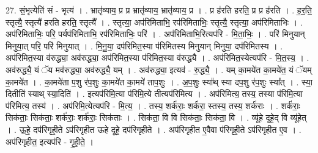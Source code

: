 \documentclass[17pt]{extarticle}
\begin{document}
27. सं॒भृत्येति॑ सं - भृत्य॑ । . भ्रातृ॑व्याय॒ प्र प्र भ्रातृ॑व्याय॒ भ्रातृ॑व्याय॒ प्र । . प्र ह॑रति हरति॒ प्र प्र ह॑रति । . ह॒र॒ति॒ स्तृत्यै॒ स्तृत्यै॑ हरति हरति॒ स्तृत्यै᳚ । . स्तृत्या॒ अप॑रिमिताभि॒ रप॑रिमिताभिः॒ स्तृत्यै॒ स्तृत्या॒ अप॑रिमिताभिः । . अप॑रिमिताभिः॒ परि॒ पर्यप॑रिमिताभि॒ रप॑रिमिताभिः॒ परि॑ । . अप॑रिमिताभि॒रित्यप॑रि - मि॒ता॒भिः॒ । . परि॑ मिनुयान् मिनुया॒त् परि॒ परि॑ मिनुयात् । . मि॒नु॒या॒ दप॑रिमित॒स्या प॑रिमितस्य मिनुयान् मिनुया॒ दप॑रिमितस्य । . अप॑रिमित॒स्या व॑रुद्ध्या॒ अव॑रुद्ध्या॒ अप॑रिमित॒स्या प॑रिमित॒स्या व॑रुद्ध्यै । . अप॑रिमित॒स्येत्यप॑रि - मि॒त॒स्य॒ । . अव॑रुद्ध्यै॒ यं ॅय मव॑रुद्ध्या॒ अव॑रुद्ध्यै॒ यम् । . अव॑रुद्ध्या॒ इत्यव॑ - रु॒द्ध्यै॒ । . यम् का॒मये॑त का॒मये॑त॒ यं ॅयम् का॒मये॑त । . का॒मये॑ता प॒शु र॑प॒शुः का॒मये॑त का॒मये॑ ताप॒शुः । . अ॒प॒शुः स्या᳚थ् स्या दप॒शु र॑प॒शुः स्या᳚त् । . स्या॒ दितीति॑ स्याथ् स्या॒दिति॑ । . इत्यप॑रिमि॒त्या प॑रिमि॒त्ये तीत्यप॑रिमित्य । . अप॑रिमित्य॒ तस्य॒ तस्या प॑रिमि॒त्या प॑रिमित्य॒ तस्य॑ । . अप॑रिमि॒त्येत्यप॑रि - मि॒त्य॒ । . तस्य॒ शर्क॑राः॒ शर्क॑रा॒ स्तस्य॒ तस्य॒ शर्क॑राः । . शर्क॑राः॒ सिक॑ताः॒ सिक॑ताः॒ शर्क॑राः॒ शर्क॑राः॒ सिक॑ताः । . सिक॑ता॒ वि वि सिक॑ताः॒ सिक॑ता॒ वि । . व्यू॑हे दूहे॒द् वि व्यू॑हेत् । . ऊ॒हे॒ दप॑रिगृही॒ते ऽप॑रिगृहीत ऊहे दूहे॒ दप॑रिगृहीते । . अप॑रिगृहीत ए॒वैवा प॑रिगृही॒ते ऽप॑रिगृहीत ए॒व । . अप॑रिगृहीत॒ इत्यप॑रि - गृ॒ही॒ते॒ । \newline
\end{document}
